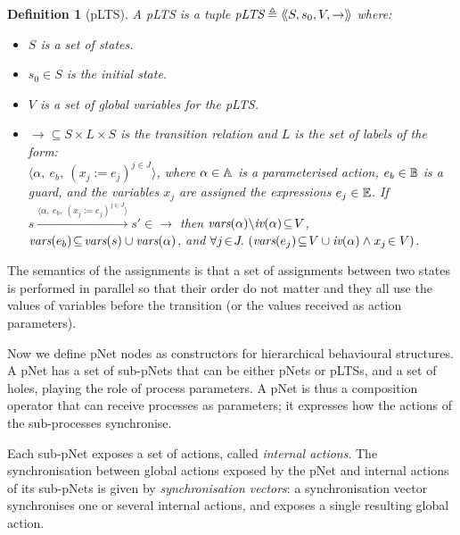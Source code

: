 \documentclass{lmcs}
\newcommand{\LUDO}[1]{\textcolor{darkgreen}{#1}}
\newtheorem{definition}{Definition}
\begin{document}
\begin{definition}[pLTS]
\label{pLTS}
A pLTS is a tuple
$\pLTS\triangleq\mylangle S,s_0, V, \to\myrangle$ where:
\begin{itemize}
\item[$\bullet$]
$S$ is a set of states.
\item[$\bullet$]
$s_0 \in S$ is the initial state.
\item[$\bullet$] $V$ is a set of global variables for the pLTS.
\item[$\bullet$] $\to \subseteq S \times L \times S$ is the transition relation and 
$L$ is the set of labels of the form:\\
$\langle \alpha,~e_b,~(x_j\!:= {e}_j)^{j\in J}\rangle$,
where $\alpha \in\mathbb{A}$ is a parameterised action, $e_b \in
\mathbb{B}$ is a guard, and the variables $x_j$ 
are assigned the expressions $e_j\in \mathbb{E}$.
If 
$s \xrightarrow{\langle \alpha,~e_b,~(x_j\!:= {e}_j)^{j\in
		J}\rangle} s'\in \to $ then 
		$\vars(\alpha)\backslash \iv(\alpha)\!\subseteq\! V$, 
		$\vars(e_b)\!\subseteq\! \vars(s)\cup\vars(\alpha)$, and
		$\forall j\!\in\! J .\,\left(\vars(e_j)\!\subseteq\! V\cup\iv(\alpha)\land 
		x_j\!\in V \right)$. %

\end{itemize}
\end{definition}

The semantics of the assignments is that a set of assignments between two states is performed in parallel so that their order do not matter and they all use the values of variables before the transition (or the values received as action parameters).


Now we define
pNet nodes as constructors for hierarchical behavioural structures.
A pNet has a set of sub-pNets that can be either pNets or pLTSs, and a
set of holes, playing the role of process parameters. A pNet is thus a composition operator that can receive processes as parameters; it expresses how the actions of the sub-processes synchronise.

Each sub-pNet exposes
a set of actions, called \emph{internal actions}. The synchronisation between global actions exposed by the pNet and
internal actions of its sub-pNets is given by  \emph{synchronisation vectors}: a
synchronisation vector synchronises one or several internal actions, and
exposes a single resulting global action.
\end{document}
